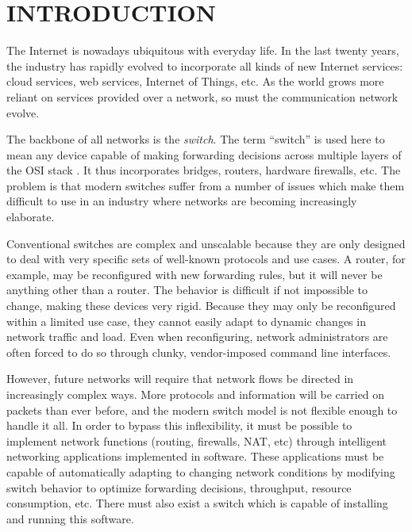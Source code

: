 \chapter{INTRODUCTION} \label{ch:intro}

%
%


The Internet is nowadays ubiquitous with everyday life. In the last twenty
years,
the industry has rapidly evolved to incorporate all kinds of new Internet
services:
cloud services, web services, Internet of Things, etc. As the world grows
more reliant on services provided over a network, so must the communication network evolve.

The backbone of all networks is the \emph{switch}. The term ``switch'' is used here to mean any device capable of making forwarding decisions across multiple layers of the OSI stack \cite{osi_model}. It thus incorporates bridges, routers, hardware firewalls, etc.
The problem is that modern switches suffer from a number of issues which make them difficult to use in an industry where networks are becoming increasingly elaborate.

Conventional switches are complex and unscalable because they are only designed to deal with very specific sets of well-known protocols and use cases. A router, for example, may be reconfigured with new forwarding rules, but it will never be anything other than a router. The behavior is difficult if not impossible to change, making these devices very rigid.
Because they may only be reconfigured within a limited use case, they cannot easily adapt to dynamic changes in network traffic and load.
Even when reconfiguring, network administrators are often forced to do so through clunky, vendor-imposed command line interfaces.

However, future networks will require that network flows be directed in increasingly complex ways. More protocols and information will be carried on packets than ever before, and the modern switch model is not flexible enough to handle it all.
In order to bypass this inflexibility, it must be possible to implement network functions (routing, firewalls, NAT, etc) through intelligent networking applications implemented in software.
These applications must be capable of automatically adapting to changing network conditions by modifying switch behavior to optimize forwarding decisions, throughput, resource consumption, etc.
There must also exist a switch which is capable of installing and running this software.

